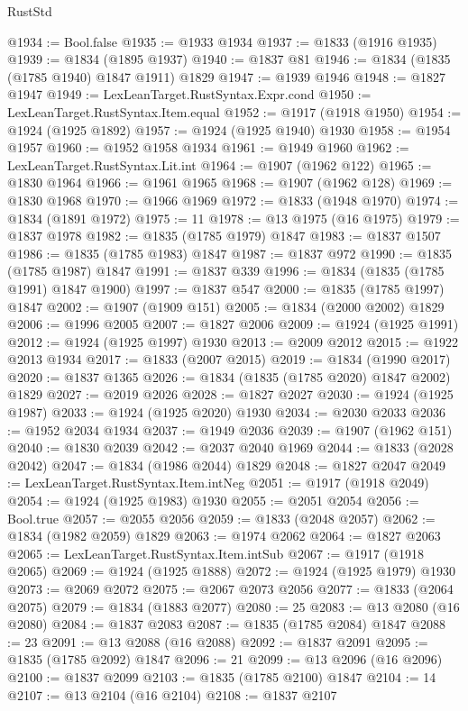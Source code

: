 \begin{lexlean}{RustStd}
\begin{coremodule}
{\begin{coremodule}
{{{{{@1934 := Bool.false
@1935 := @1933 @1934
@1937 := @1833 (@1916 @1935)
@1939 := @1834 (@1895 @1937)
@1940 := @1837 @81
@1946 := @1834 (@1835 (@1785 @1940) @1847 @1911) @1829
@1947 := @1939 @1946
@1948 := @1827 @1947
@1949 := LexLeanTarget.RustSyntax.Expr.cond
@1950 := LexLeanTarget.RustSyntax.Item.equal
@1952 := @1917 (@1918 @1950)
@1954 := @1924 (@1925 @1892)
@1957 := @1924 (@1925 @1940) @1930
@1958 := @1954 @1957
@1960 := @1952 @1958 @1934
@1961 := @1949 @1960
@1962 := LexLeanTarget.RustSyntax.Lit.int
@1964 := @1907 (@1962 @122)
@1965 := @1830 @1964
@1966 := @1961 @1965
@1968 := @1907 (@1962 @128)
@1969 := @1830 @1968
@1970 := @1966 @1969
@1972 := @1833 (@1948 @1970)
@1974 := @1834 (@1891 @1972)
@1975 := 11
@1978 := @13 @1975 (@16 @1975)
@1979 := @1837 @1978
@1982 := @1835 (@1785 @1979) @1847
@1983 := @1837 @1507
@1986 := @1835 (@1785 @1983) @1847
@1987 := @1837 @972
@1990 := @1835 (@1785 @1987) @1847
@1991 := @1837 @339
@1996 := @1834 (@1835 (@1785 @1991) @1847 @1900)
@1997 := @1837 @547
@2000 := @1835 (@1785 @1997) @1847
@2002 := @1907 (@1909 @151)
@2005 := @1834 (@2000 @2002) @1829
@2006 := @1996 @2005
@2007 := @1827 @2006
@2009 := @1924 (@1925 @1991)
@2012 := @1924 (@1925 @1997) @1930
@2013 := @2009 @2012
@2015 := @1922 @2013 @1934
@2017 := @1833 (@2007 @2015)
@2019 := @1834 (@1990 @2017)
@2020 := @1837 @1365
@2026 := @1834 (@1835 (@1785 @2020) @1847 @2002) @1829
@2027 := @2019 @2026
@2028 := @1827 @2027
@2030 := @1924 (@1925 @1987)
@2033 := @1924 (@1925 @2020) @1930
@2034 := @2030 @2033
@2036 := @1952 @2034 @1934
@2037 := @1949 @2036
@2039 := @1907 (@1962 @151)
@2040 := @1830 @2039
@2042 := @2037 @2040 @1969
@2044 := @1833 (@2028 @2042)
@2047 := @1834 (@1986 @2044) @1829
@2048 := @1827 @2047
@2049 := LexLeanTarget.RustSyntax.Item.intNeg
@2051 := @1917 (@1918 @2049)
@2054 := @1924 (@1925 @1983) @1930
@2055 := @2051 @2054
@2056 := Bool.true
@2057 := @2055 @2056
@2059 := @1833 (@2048 @2057)
@2062 := @1834 (@1982 @2059) @1829
@2063 := @1974 @2062
@2064 := @1827 @2063
@2065 := LexLeanTarget.RustSyntax.Item.intSub
@2067 := @1917 (@1918 @2065)
@2069 := @1924 (@1925 @1888)
@2072 := @1924 (@1925 @1979) @1930
@2073 := @2069 @2072
@2075 := @2067 @2073 @2056
@2077 := @1833 (@2064 @2075)
@2079 := @1834 (@1883 @2077)
@2080 := 25
@2083 := @13 @2080 (@16 @2080)
@2084 := @1837 @2083
@2087 := @1835 (@1785 @2084) @1847
@2088 := 23
@2091 := @13 @2088 (@16 @2088)
@2092 := @1837 @2091
@2095 := @1835 (@1785 @2092) @1847
@2096 := 21
@2099 := @13 @2096 (@16 @2096)
@2100 := @1837 @2099
@2103 := @1835 (@1785 @2100) @1847
@2104 := 14
@2107 := @13 @2104 (@16 @2104)
@2108 := @1837 @2107
}}}}}
\end{coremodule}}
\end{coremodule}
\end{lexlean}
